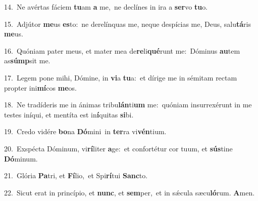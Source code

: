 {\numbfont\textcolor{\numbcolor}{14.}}~Ne avértas fáciem \textbf{tu}\-am \textbf{a} me,~\star ne declínes in ira a \textbf{ser}\-vo \textbf{tu}\-o.\par
{\numbfont\textcolor{\numbcolor}{15.}}~Adjútor \textbf{me}\-us \textbf{es}\-to:~\star ne derelínquas me, neque despícias me, Deus, salu\-\textbf{tá}\-ris \textbf{me}\-us.\par
{\numbfont\textcolor{\numbcolor}{16.}}~Quóniam pater meus, et mater mea de\-\textbf{re}\-li\-\textbf{qué}\-runt me:~\star Dóminus \textbf{au}\-tem as\-\textbf{súmp}\-sit me.\par
{\numbfont\textcolor{\numbcolor}{17.}}~Legem pone mihi, Dómine, in \textbf{vi}\-a \textbf{tu}\-a:~\star et dírige me in sémitam rectam propter ini\-\textbf{mí}\-cos \textbf{me}\-os.\par
{\numbfont\textcolor{\numbcolor}{18.}}~Ne tradíderis me in ánimas tribu\-\textbf{lán}\-ti\textbf{um} me:~\star quóniam insurrexérunt in me testes iníqui, et mentíta est in\-\textbf{í}\-quitas \textbf{si}\-bi.\par
{\numbfont\textcolor{\numbcolor}{19.}}~Credo vidére \textbf{bo}\-na \textbf{Dó}\-mini~\star in \textbf{ter}\-ra vi\-\textbf{vén}\-tium.\par
{\numbfont\textcolor{\numbcolor}{20.}}~Exspécta Dóminum, vi\-\textbf{rí}\-liter \textbf{a}\-ge:~\star et confortétur cor tuum, et \textbf{sús}\-tine \textbf{Dó}\-minum.\par
{\numbfont\textcolor{\numbcolor}{21.}}~Glória \textbf{Pa}\-tri, et \textbf{Fí}\-lio,~\star et Spi\-\textbf{rí}\-tui \textbf{Sanc}\-to.\par
{\numbfont\textcolor{\numbcolor}{22.}}~Sicut erat in princípio, et \textbf{nunc}\-, et \textbf{sem}\-per,~\star et in sǽcula sæcu\-\textbf{ló}\-rum. \textbf{A}\-men.\par
